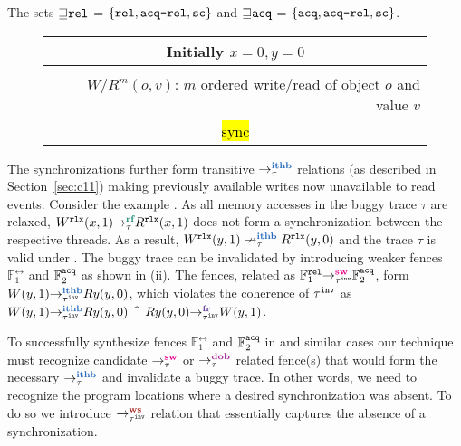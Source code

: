 \noindent
The sets ${\sqsupseteq}\texttt{rel}$ = $\{\texttt{rel},\texttt{acq-rel},\texttt{sc}\}$ and
${\sqsupseteq}\texttt{acq}$ = $\{\texttt{acq},\texttt{acq-rel},\texttt{sc}\}$.

\setlength{\textfloatsep}{0pt}
\begin{wrapfigure}{l}{0.6\textwidth}
	\vspace{-2.5em}
	\begin{tabular}{|c|c|}
		\multicolumn{2}{c}{Initially $x = 0, y = 0$} \\
		
		\hline
		\resizebox{0.29\textwidth}{!}{} &
		\resizebox{0.29\textwidth}{!}{} \\
		\hline

		\multicolumn{2}{r}{\scriptsize 
		$W/R^m(o,v)$: $m$ ordered write/read of object $o$ and value $v$} \\
		\multicolumn{2}{c}{\hl{sync}}
	\end{tabular}
	\vspace{-2.5em}
\end{wrapfigure}

\noindent
The synchronizations further form transitive $\setITHB$ relations
(as described in Section~\ref{sec:c11})
making previously available writes now unavailable to read events.
%
Consider the example . As all memory accesses in the
buggy trace $\tau$ are relaxed, 
$\rf{\tau}{W^\rlx(x,1)}{R^\rlx(x,1)}$ does not form a synchronization
between the respective threads. As a result, 
$\nithb{\tau}{W^\rlx(y,1)}{R^\rlx(y,0)}$ and the trace $\tau$ is valid
under \cc. 
%
The buggy trace can be invalidated by introducing weaker fences
$\mathbb{F}^\rel_1$ and $\mathbb{F}^\texttt{acq}_2$ as shown in (ii).
The fences, related as 
$\sw{\inv{\tau}}{\mathbb{F}^\rel_1}{\mathbb{F}^\acq_2}$, form
$\ithb{\inv{\tau}}{W(y,1)}{Ry(y,0)}$, which violates the coherence of 
${\tau}^{\mathtt{inv}}$ as $\ithb{\inv{\tau}}{W(y,1)}{Ry(y,0)}$ $\^$ 
$\fr{\inv{\tau}}{Ry(y,0)}{W(y,1)}$. 

To successfully synthesize fences $\mathbb{F}^\rel_1$ and 
$\mathbb{F}^\texttt{acq}_2$ in  and similar cases our
technique must recognize candidate $\setSW$ or $\setDOB$
related fence(s) that would form the necessary $\setITHB$ 
and invalidate a buggy trace. In other words, we need to 
recognize the program locations where a desired 
synchronization was absent. 
%
To do so we introduce $\setWS$ relation
that essentially captures the absence of a synchronization.


